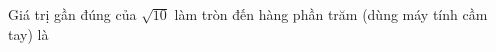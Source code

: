 \begin{ex}
Giá trị gần đúng của $\sqrt{10}$ làm tròn đến hàng phần trăm (dùng máy tính cầm tay) là
\end{ex}
